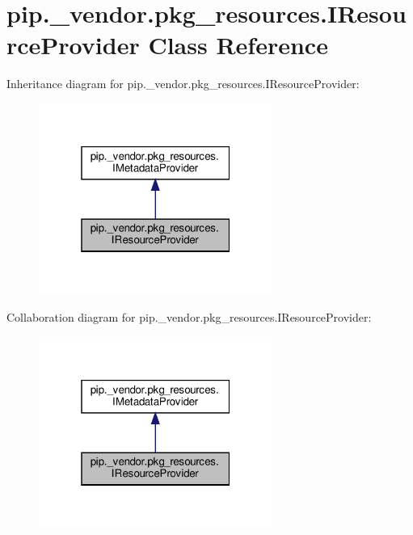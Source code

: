 \hypertarget{classpip_1_1__vendor_1_1pkg__resources_1_1IResourceProvider}{}\section{pip.\+\_\+vendor.\+pkg\+\_\+resources.\+I\+Resource\+Provider Class Reference}
\label{classpip_1_1__vendor_1_1pkg__resources_1_1IResourceProvider}


Inheritance diagram for pip.\+\_\+vendor.\+pkg\+\_\+resources.\+I\+Resource\+Provider\+:
\nopagebreak
\begin{figure}[H]
\begin{center}
\leavevmode
\includegraphics[width=217pt]{classpip_1_1__vendor_1_1pkg__resources_1_1IResourceProvider__inherit__graph}
\end{center}
\end{figure}


Collaboration diagram for pip.\+\_\+vendor.\+pkg\+\_\+resources.\+I\+Resource\+Provider\+:
\nopagebreak
\begin{figure}[H]
\begin{center}
\leavevmode
\includegraphics[width=217pt]{classpip_1_1__vendor_1_1pkg__resources_1_1IResourceProvider__coll__graph}
\end{center}
\end{figure}
